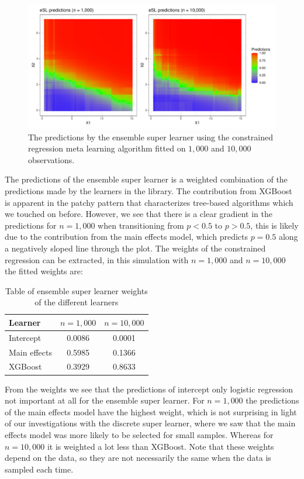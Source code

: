 \documentclass[./main.tex]{subfiles}
\begin{document}
\begin{figure}[H]
    \centering
    \includegraphics[width=\textwidth]{figures/esl_preds_par.pdf}
    \caption{The predictions by the ensemble super learner using the constrained regression meta learning algorithm fitted on $ 1,000 $ and $ 10,000 $ observations.}
    \label{fig:esl_preds_quad_prog}
\end{figure}
The predictions of the ensemble super learner is a weighted combination of the predictions made by the learners in the library. The contribution from XGBoost is apparent in the patchy pattern that characterizes tree-based algorithms which we touched on before. However, we see that there is a clear gradient in the predictions for $ n = 1,000 $ when transitioning from $ p < 0.5 $ to $ p > 0.5 $, this is likely due to the contribution from the main effects model, which predicts $ p = 0.5 $ along a negatively sloped line through the plot. The weights of the constrained regression can be extracted, in this simulation with $ n = 1,000 $ and $ n = 10,000 $ the fitted weights are: 
\begin{table}[H]
\centering
\begin{tabular}{lcc}
\hline
Learner & $ n = 1,000 $ & $ n = 10,000 $\\
\hline
Intercept & 0.0086 & 0.0001 \\
Main effects & 0.5985 & 0.1366 \\
XGBoost & 0.3929 & 0.8633 \\
\hline
\end{tabular}
\caption{Table of ensemble super learner weights of the different learners}
\end{table}
From the weights we see that the predictions of intercept only logistic regression not important at all for the ensemble super learner. For $ n = 1,000 $ the predictions of the main effects model have the highest weight, which is not surprising in light of our investigations with the discrete super learner, where we saw that the main effects model was more likely to be selected for small samples. Whereas for $ n = 10,000 $ it is weighted a lot less than XGBoost. Note that these weights depend on the data, so they are not necessarily the same when the data is sampled each time. 
\end{document}
